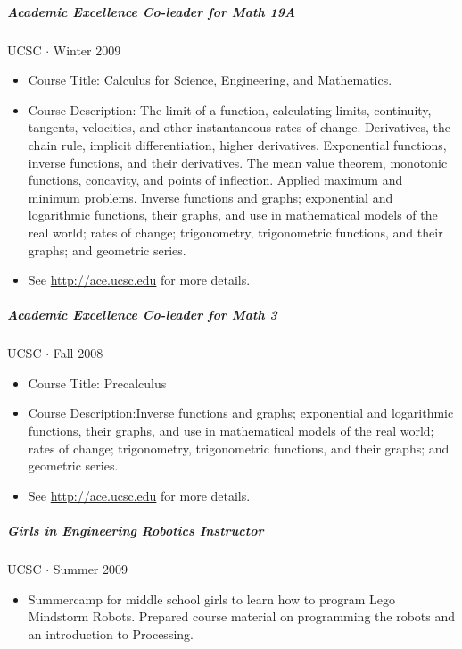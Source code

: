 \documentclass[10pt,letterpaper]{article}
\begin{document}
\subparagraph{Academic Excellence Co-leader for Math 19A}
UCSC $\cdot$ Winter 2009
\begin{itemize}
\item Course Title: Calculus for Science, Engineering, and Mathematics. 
\item Course Description: The limit of a function, calculating limits, continuity, tangents, velocities, and other instantaneous rates of change. Derivatives, the chain rule, implicit differentiation, higher derivatives. Exponential functions, inverse functions, and their derivatives. The mean value theorem, monotonic functions, concavity, and points of inflection. Applied maximum and minimum problems. Inverse functions and graphs; exponential and logarithmic functions, their graphs, and use in mathematical models of the real world; rates of change; trigonometry, trigonometric functions, and their graphs; and geometric series. 
\item See \url{http://ace.ucsc.edu} for more details.
\end{itemize}

\subparagraph{Academic Excellence Co-leader for Math 3}
UCSC $\cdot$ Fall 2008
\begin{itemize}
\item Course Title: Precalculus
\item Course Description:Inverse functions and graphs; exponential and logarithmic functions, their graphs, and use in mathematical models of the real world; rates of change; trigonometry, trigonometric functions, and their graphs; and geometric series. 
\item See \url{http://ace.ucsc.edu} for more details.
\end{itemize}

\subparagraph{Girls in Engineering Robotics Instructor}
UCSC $\cdot$ Summer 2009
\begin{itemize}
\item Summercamp for middle school girls to learn how to program Lego Mindstorm Robots. Prepared course material on programming the robots and an introduction to Processing.
\end{itemize}


\iffalse
\end{document}
